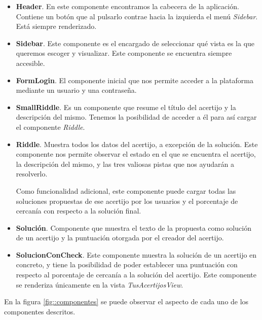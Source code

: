 \begin{itemize}
    \item \textbf{Header}. En este componente encontramos la cabecera de la aplicación. Contiene un botón que al pulsarlo contrae hacia la izquierda el menú \textit{Sidebar}. Está siempre renderizado.
    \item \textbf{Sidebar}. Este componente es el encargado de seleccionar qué vista es la que queremos escoger y visualizar. Este componente se encuentra siempre accesible.
    \item \textbf{FormLogin}. El componente inicial que nos permite acceder a la plataforma mediante un usuario y una contraseña.
    \item \textbf{SmallRiddle}. Es un componente que resume el título del acertijo y la descripción del mismo. Tenemos la posibilidad de acceder a él para así cargar el componente \textit{Riddle}.
    \item \textbf{Riddle}. Muestra todos los datos del acertijo, a excepción de la solución. Este componente nos permite observar el estado en el que se encuentra el acertijo, la descripción del mismo, y las tres valiosas pistas que nos ayudarán a resolverlo.
    
    Como funcionalidad adicional, este componente puede cargar todas las soluciones propuestas de ese acertijo  por los usuarios y el porcentaje de cercanía con respecto a la solución final.
    \item \textbf{Solución}. Componente que muestra el texto de la propuesta como solución de un acertijo y la puntuación otorgada por el creador del acertijo.
    \item \textbf{SolucionConCheck}. Este componente muestra la solución de un acertijo en concreto, y tiene la posibilidad de poder establecer una puntuación con respecto al porcentaje de cercanía a la solución del acertijo. Este componente se renderiza únicamente en la vista \textit{TusAcertijosView}.
\end{itemize}

En la figura \ref{fig::componentes} se puede observar el aspecto de cada uno de los componentes descritos.


